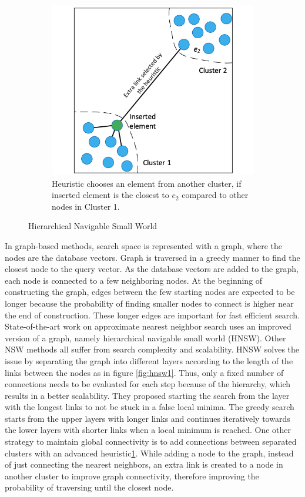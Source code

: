 \begin{figure}
\begin{subfigure}[b]{0.45\textwidth}
        \includegraphics[width=\textwidth]{thesis/images/hnsw-fig2.png}
        \caption{Heuristic chooses an element from another cluster, if inserted element is the closest to $e_2$ compared to other nodes in Cluster 1.}
        \label{fig:hnsw2}
    \end{subfigure}
    \caption{Hierarchical Navigable Small World~\cite{malkov2018efficient}}
    \label{fig:hnsw}
\end{figure}

In graph-based methods, search space is represented with a graph, where the nodes are the database vectors. 
Graph is traversed in a greedy manner to find the closest node to the query vector.
As the database vectors are added to the graph, each node is connected to a few neighboring nodes.
At the beginning of constructing the graph, edges between the few starting nodes are expected to be longer because the probability of finding smaller nodes to connect is higher near the end of construction.
These longer edges are important for fast efficient search.
State-of-the-art work on approximate nearest neighbor search uses an improved version of a graph, namely hierarchical navigable small world (HNSW)\cite{malkov2018efficient}. 
Other NSW methods all suffer from search complexity and scalability. 
HNSW solves the issue by separating the graph into different layers according to the length of the links between the nodes as in figure \ref{fig:hnsw1}. 
Thus, only a fixed number of connections needs to be evaluated for each step because of the hierarchy, which results in a better scalability.
They proposed starting the search from the layer with the longest links to not be stuck in a false local minima. 
The greedy search starts from the upper layers with longer links and continues iteratively towards the lower layers with shorter links when a local minimum is reached.
One other strategy to maintain global connectivity is to add connections between separated clusters with an advanced heuristic\ref{fig:hnsw2}. 
While adding a node to the graph, instead of just connecting the nearest neighbors, an extra link is created to a node in another cluster to improve graph connectivity, therefore improving the probability of traversing until the closest node.

